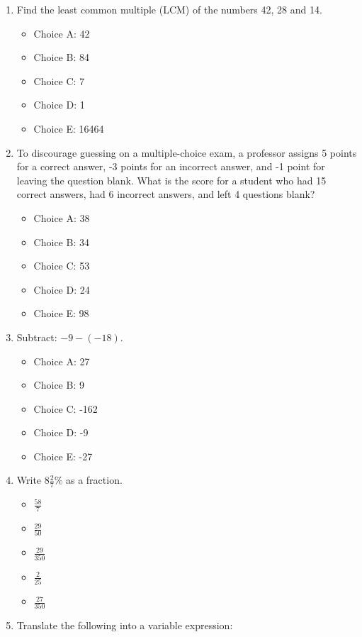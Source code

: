 \documentclass{ximera}
\begin{document}
\begin{enumerate}
    \item Find the least common multiple (LCM) of the numbers 42, 28 and 14.\\
    \begin{itemize}
        \item Choice A: 42
        \item Choice B: 84
        \item Choice C: 7
        \item Choice D: 1
        \item Choice E: 16464
    \end{itemize}
    \item To discourage guessing on a multiple-choice exam, a professor assigns 5 points for a correct answer, -3 points for an incorrect answer, and -1 point for leaving the question blank. What is the score for a student who had 15 correct answers, had 6 incorrect answers, and left 4 questions blank?
    \begin{itemize}
        \item Choice A: 38
        \item Choice B: 34
        \item Choice C: 53
        \item Choice D: 24
        \item Choice E: 98
    \end{itemize}
    \item Subtract: $-9-(-18)$.\\
    \begin{itemize}
        \item Choice A: 27\\
        \item Choice B: 9 \\
        \item Choice C: -162\\
        \item Choice D: -9\\
        \item Choice E: -27\\
    \end{itemize}
    \item Write $8 \frac{2}{7} \%$ as a fraction.
    \begin{itemize}
        \item $\frac{58}{7}$
        \item $\frac{29}{50}$
        \item $\frac{29}{350}$
        \item $\frac{2}{25}$
        \item $\frac{27}{350}$
    \end{itemize}
    \item Translate the following into a variable expression:


\end{enumerate}
\end{document}
